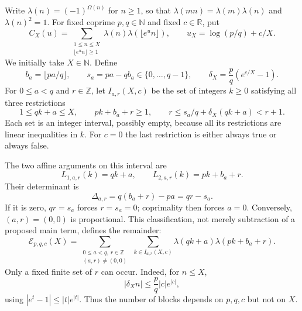 \documentclass[11pt,a4paper]{article}
\numberwithin{equation}{section}
\theoremstyle{remark}\newtheorem{remark}[theorem]{Remark}
\newcommand{\N}{\mathbb N}
\newcommand{\Z}{\mathbb Z}
\newcommand{\R}{\mathbb R}
\newcommand{\1}{\mathbf 1}
\begin{document}
Write $\lambda(n)=(-1)^{\Omega(n)}$ for $n\ge1$, so that
$\lambda(mn)=\lambda(m)\lambda(n)$ and $\lambda(n)^2=1$.
For fixed coprime $p,q\in\N$ and fixed $c\in\R$, put
\begin{equation}\label{eq:CX}
 C_X(u)=\sum_{\substack{1\le n\le X\\\lfloor e^u n\rfloor\ge1}}
 \lambda(n)\lambda(\lfloor e^u n\rfloor),\qquad
 u_X=\log(p/q)+c/X.
\end{equation}
We initially take $X\in\N$. Define
\[
 b_a=\lfloor pa/q\rfloor,\qquad
 s_a=pa-qb_a\in\{0,\ldots,q-1\},\qquad
 \delta_X=\frac pq(e^{c/X}-1).
\]
For $0\le a<q$ and $r\in\Z$, let $I_{a,r}(X,c)$ be the set of integers
$k\ge0$ satisfying all three restrictions
\begin{equation}\label{eq:I}
 1\le qk+a\le X,\qquad pk+b_a+r\ge1,\qquad
 r\le s_a/q+\delta_X(qk+a)<r+1.
\end{equation}
Each set is an integer interval, possibly empty, because all its
restrictions are linear inequalities in $k$. For $c=0$ the last
restriction is either always true or always false.

The two affine arguments on this interval are
\begin{equation}\label{eq:forms}
 L_{1,a,r}(k)=qk+a,\qquad L_{2,a,r}(k)=pk+b_a+r.
\end{equation}
Their determinant is
\begin{equation}\label{eq:det}
 \Delta_{a,r}=q(b_a+r)-pa=qr-s_a.
\end{equation}
If it is zero, $qr=s_a$ forces $r=s_a=0$; coprimality then forces
$a=0$. Conversely, $(a,r)=(0,0)$ is proportional. This classification,
not merely subtraction of a proposed main term, defines the remainder:
\begin{equation}\label{eq:E}
 \mathcal E_{p,q,c}(X)=
 \sum_{\substack{0\le a<q,\ r\in\Z\\(a,r)\ne(0,0)}}
 \ \sum_{k\in I_{a,r}(X,c)}
 \lambda(qk+a)\lambda(pk+b_a+r).
\end{equation}
Only a fixed finite set of $r$ can occur. Indeed, for $n\le X$,
\[
 |\delta_X n|\le\frac pq |c|e^{|c|},
\]
using $|e^t-1|\le |t|e^{|t|}$. Thus the number of blocks depends on
$p,q,c$ but not on $X$.
\end{document}

